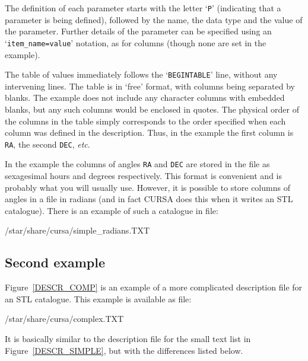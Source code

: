 \documentclass[twoside,11pt]{starlink}
\begin{document}
The definition of each parameter starts with the letter `\texttt{P}'
(indicating that a parameter is being defined), followed by the name, the
data type and the value of the parameter.  Further details of the
parameter can be specified using an `\texttt{item\_name=value}'
notation, as for columns (though none are set in the example).

The table of values immediately follows the `\texttt{BEGINTABLE}' line,
without any intervening lines.  The table is in `free' format, with
columns being separated by blanks.  The example does not include any
character columns with embedded blanks, but any such columns would be
enclosed in quotes.  The physical order of the columns in the table
simply corresponds to the order specified when each column was defined
in the description.  Thus, in the example the first column is \texttt{RA},
the second \texttt{DEC}, \emph{etc}.

In the example the columns of angles \texttt{RA} and \texttt{DEC} are stored
in the file as sexagesimal hours and degrees respectively.  This format
is convenient and is probably what you will usually use.  However, it is
possible to store columns of angles in a file in radians (and in fact
CURSA does this when it writes an STL catalogue).  There is an example of
such a catalogue in file:

\begin{terminalv}
/star/share/cursa/simple_radians.TXT
\end{terminalv}

\subsection{Second example}

Figure~\ref{DESCR_COMP} is an example of a more complicated description
file for an STL catalogue.  This example is available as file:

\begin{terminalv}
/star/share/cursa/complex.TXT
\end{terminalv}

It is basically similar to the description file for the small text list
in Figure~\ref{DESCR_SIMPLE}, but with the differences listed below.
\end{document}
